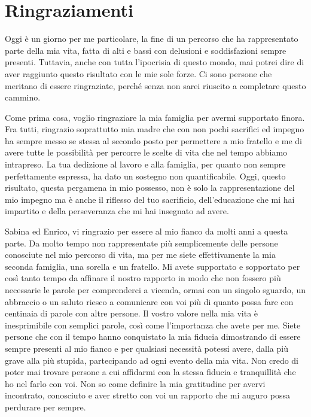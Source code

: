\chapter*{Ringraziamenti}
\fancyhf{}

Oggi è un giorno per me particolare, la fine di un percorso che ha rappresentato parte della mia vita, fatta di alti e bassi con delusioni e soddisfazioni sempre presenti. Tuttavia, anche con tutta l'ipocrisia di questo mondo, mai potrei dire di aver raggiunto questo risultato con le mie sole forze. Ci sono persone che meritano di essere ringraziate, perché senza non sarei riuscito a completare questo cammino.

Come prima cosa, voglio ringraziare la mia famiglia per avermi supportato finora. Fra tutti, ringrazio soprattutto mia madre che con non pochi sacrifici ed impegno ha sempre messo se stessa al secondo posto per permettere a mio fratello e me di avere tutte le possibilità per percorre le scelte di vita che nel tempo abbiamo intrapreso. La tua dedizione al lavoro e alla famiglia, per quanto non sempre perfettamente espressa, ha dato un sostegno non quantificabile. Oggi, questo risultato, questa pergamena in mio possesso, non è solo la rappresentazione del mio impegno ma è anche il riflesso del tuo sacrificio, dell'educazione che mi hai impartito e della perseveranza che mi hai insegnato ad avere.

Sabina ed Enrico, vi ringrazio per essere al mio fianco da molti anni a questa parte. Da molto tempo non rappresentate più semplicemente delle persone conosciute nel mio percorso di vita, ma per me siete effettivamente la mia seconda famiglia, una sorella e un fratello. Mi avete supportato e sopportato per così tanto tempo da affinare il nostro rapporto in modo che non fossero più necessarie le parole per comprenderci a vicenda, ormai con un singolo sguardo, un abbraccio o un saluto riesco a comunicare con voi più di quanto possa fare con centinaia di parole con altre persone. Il vostro valore nella mia vita è inesprimibile con semplici parole, così come l'importanza che avete per me. Siete persone che con il tempo hanno conquistato la mia fiducia dimostrando di essere sempre presenti al mio fianco e per qualsiasi necessità potessi avere, dalla più grave alla più stupida, partecipando ad ogni evento della mia vita. Non credo di poter mai trovare persone a cui affidarmi con la stessa fiducia e tranquillità che ho nel farlo con voi. Non so come definire la mia gratitudine per avervi incontrato, conosciuto e aver stretto con voi un rapporto che mi auguro possa perdurare per sempre.

